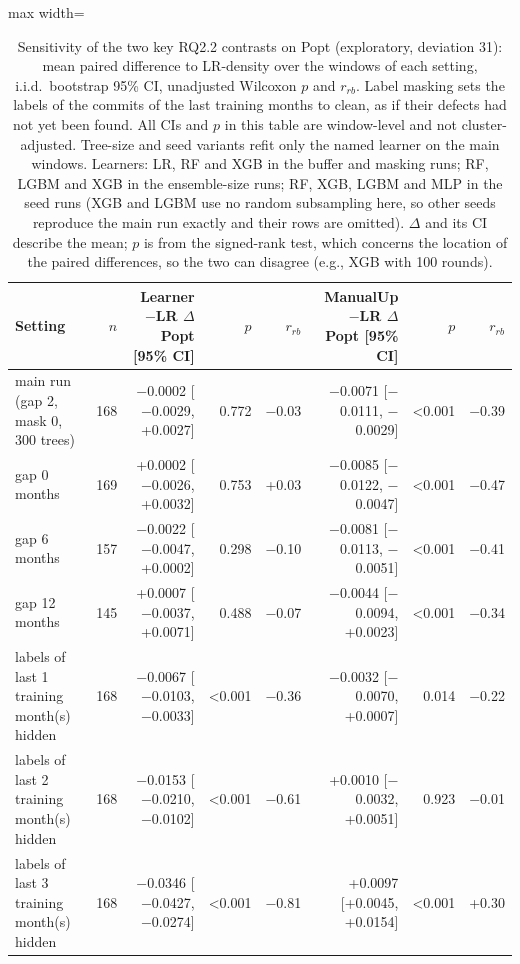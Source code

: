 \begin{table}[t]
\centering
\footnotesize
\caption{Sensitivity of the two key RQ2.2 contrasts on Popt (exploratory, deviation 31): mean paired difference to LR-density over the windows of each setting, i.i.d.\ bootstrap 95\% CI, unadjusted Wilcoxon $p$ and $r_{rb}$. Label masking sets the labels of the commits of the last training months to clean, as if their defects had not yet been found. All CIs and $p$ in this table are window-level and not cluster-adjusted. Tree-size and seed variants refit only the named learner on the main windows. Learners: LR, RF and XGB in the buffer and masking runs; RF, LGBM and XGB in the ensemble-size runs; RF, XGB, LGBM and MLP in the seed runs (XGB and LGBM use no random subsampling here, so other seeds reproduce the main run exactly and their rows are omitted). $\Delta$ and its CI describe the mean; $p$ is from the signed-rank test, which concerns the location of the paired differences, so the two can disagree (e.g., XGB with 100 rounds).}
\label{tab:p2-sens}
\begin{adjustbox}{max width=\linewidth}
\begin{tabular}{lrrrrrrr}
\toprule
Setting & $n$ & Learner$-$LR $\Delta$Popt [95\% CI] & $p$ & $r_{rb}$ & ManualUp$-$LR $\Delta$Popt [95\% CI] & $p$  & $r_{rb}$  \\
\midrule
main run (gap 2, mask 0, 300 trees) & 168 & $-$0.0002 [$-$0.0029, +0.0027] & 0.772 & $-$0.03 & $-$0.0071 [$-$0.0111, $-$0.0029] & <0.001 & $-$0.39 \\
gap 0 months & 169 & +0.0002 [$-$0.0026, +0.0032] & 0.753 & +0.03 & $-$0.0085 [$-$0.0122, $-$0.0047] & <0.001 & $-$0.47 \\
gap 6 months & 157 & $-$0.0022 [$-$0.0047, +0.0002] & 0.298 & $-$0.10 & $-$0.0081 [$-$0.0113, $-$0.0051] & <0.001 & $-$0.41 \\
gap 12 months & 145 & +0.0007 [$-$0.0037, +0.0071] & 0.488 & $-$0.07 & $-$0.0044 [$-$0.0094, +0.0023] & <0.001 & $-$0.34 \\
labels of last 1 training month(s) hidden & 168 & $-$0.0067 [$-$0.0103, $-$0.0033] & <0.001 & $-$0.36 & $-$0.0032 [$-$0.0070, +0.0007] & 0.014 & $-$0.22 \\
labels of last 2 training month(s) hidden & 168 & $-$0.0153 [$-$0.0210, $-$0.0102] & <0.001 & $-$0.61 & +0.0010 [$-$0.0032, +0.0051] & 0.923 & $-$0.01 \\
labels of last 3 training month(s) hidden & 168 & $-$0.0346 [$-$0.0427, $-$0.0274] & <0.001 & $-$0.81 & +0.0097 [+0.0045, +0.0154] & <0.001 & +0.30 \\

\end{tabular}
\end{adjustbox}
\end{table}
